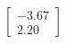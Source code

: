 \documentclass[preview]{standalone}
\begin{document}
\begin{align*}
\begin{bmatrix} -3.67 \\ 2.20 \end{bmatrix}
\end{align*}
\end{document}
